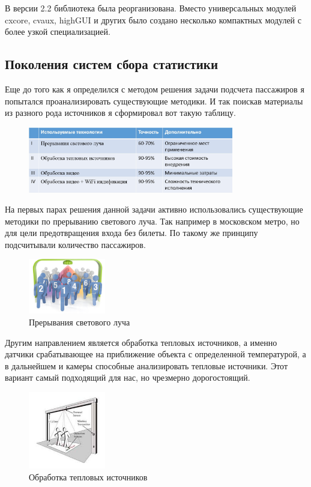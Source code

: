 \documentclass[12pt]{article}
\begin{document}
В версии 2.2 библиотека была реорганизована. Вместо универсальных модулей cxcore, cvaux, highGUI и других было создано несколько компактных модулей с более узкой специализацией.


 	\subsection{Поколения систем сбора статистики}
			\hspace{\parindent}

Еще до того как я определился с методом решения задачи подсчета пассажиров я попытался проанализировать существующие методики. И так поискав материалы из разного рода источников я сформировал вот такую таблицу. 

\begin{figure}[h!]
  \centering
    \includegraphics[width=0.8\textwidth]{pic/generation.jpg}
\end{figure}

На первых парах решения данной задачи активно использовались существующие методики по прерыванию светового луча. Так например в московском метро, но для цели предотвращения входа без билеты. По такому же принципу подсчитывали количество пассажиров.
\begin{figure}[h!]
  \centering
    \includegraphics[width=0.3\textwidth]{pic/schem.jpg}
  \caption{Прерывания светового луча}
\end{figure}
 Другим направлением является обработка тепловых источников, а именно датчики срабатывающее на приближение объекта с определенной температурой, а в дальнейшем и камеры способные анализировать тепловые источники. Этот вариант самый подходящий для нас, но чрезмерно дорогостоящий.

\begin{figure}[h!]
  \centering
    \includegraphics[width=0.3\textwidth]{pic/termal_counting.jpg}
  \caption{Обработка тепловых источников}
\end{figure}
\end{document}
